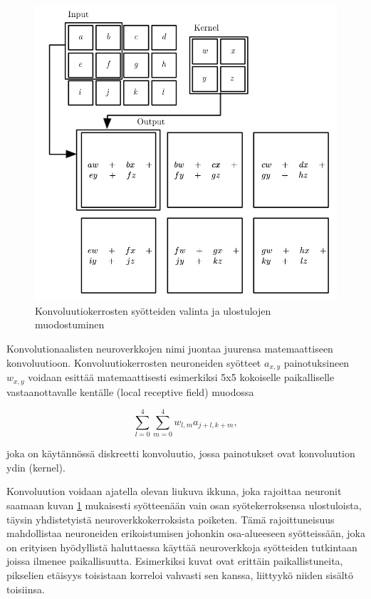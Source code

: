 \documentclass[finnish]{tktltiki2}
\theoremstyle{definition}
\theoremstyle{remark}
\begin{document}
    \begin{figure}[h]
      \centering
      \includegraphics[scale=0.4]{convolution}
      \caption{Konvoluutiokerrosten syötteiden valinta ja ulostulojen muodostuminen \cite{Goodfellow-et-al-2016}}
      \label{pic:convolution}
    \end{figure}

    Konvolutionaalisten neuroverkkojen nimi juontaa juurensa matemaattiseen konvoluutioon. Konvoluutiokerrosten neuroneiden syötteet $a_{x,y}$ painotuksineen $w_{x,y}$ voidaan esittää matemaattisesti esimerkiksi 5x5 kokoiselle paikalliselle vastaanottavalle kentälle (local receptive field) muodossa

    $$ \sum_{l=0}^{4}\sum_{m=0}^{4} w_{l,m}a_{j+l,k+m},$$
    
    joka on käytännössä diskreetti konvoluutio, jossa painotukset ovat konvoluution ydin (kernel).

    Konvoluution voidaan ajatella olevan liukuva ikkuna, joka rajoittaa neuronit saamaan kuvan \ref{pic:convolution} mukaisesti syötteenään vain osan syötekerroksensa ulostuloista, täysin yhdistetyistä neuroverkkokerroksista poiketen. Tämä rajoittuneisuus mahdollistaa neuroneiden erikoistumisen johonkin osa-alueeseen syötteissään, joka on erityisen hyödyllistä haluttaessa käyttää neuroverkkoja syötteiden tutkintaan joissa ilmenee paikallisuutta. Esimerkiksi kuvat ovat erittäin paikallistuneita, pikselien etäisyys toisistaan korreloi vahvasti sen kanssa, liittyykö niiden sisältö toisiinsa.
\end{document}
